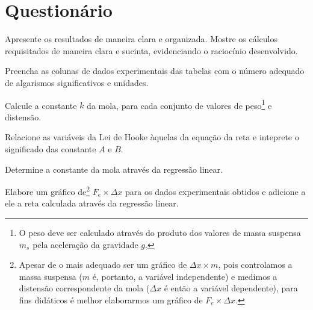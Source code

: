 \vspace{5mm}

\section{Questionário}

\begin{question}[type={exam}]{1}
Apresente os resultados de maneira clara e organizada. Mostre os cálculos requisitados de maneira clara e sucinta, evidenciando o raciocínio desenvolvido.
\end{question}

\begin{question}[type={exam}]{2}
Preencha as colunas de dados experimentais das tabelas com o número adequado de algarismos significativos e unidades.
\end{question}

\begin{question}[type={exam}]{1} 
Calcule a constante $k$ da mola, para cada conjunto de valores de peso\footnote{O peso deve ser calculado através do produto dos valores de massa suspensa $m_s$ pela aceleração da gravidade $g$.} e distensão.
\end{question}

\begin{question}[type={exam}]{1} 
Relacione as variáveis da Lei de Hooke àquelas da equação da reta e inteprete o significado das constante $A$ e $B$.
\end{question}

\begin{question}[type={exam}]{2} 
Determine a constante da mola através da regressão linear.
\end{question}

\begin{question}[type={exam}]{2} 
Elabore um gráfico de\footnote{Apesar de o mais adequado ser um gráfico de $\Delta x \times m$, pois controlamos a massa suspensa ($m$ é, portanto, a variável independente) e medimos a distensão correspondente da mola ($\Delta x$ é então a variável dependente), para fins didáticos é melhor elaborarmos um gráfico de  $F_e \times \Delta x$.} $F_e \times \Delta x$ para os dados experimentais obtidos e adicione a ele a reta calculada através da regressão linear.
\end{question}

